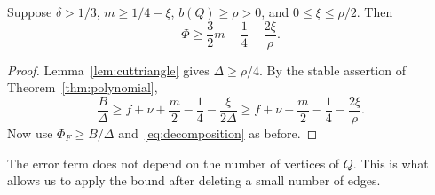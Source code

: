 \begin{theorem}\label{thm:stable}
Suppose $\delta>1/3$, $m\ge1/4-\xi$, $b(Q)\ge\rho>0$, and $0\le\xi\le\rho/2$. Then
\begin{equation}\label{eq:stable}
 \Phi\ge\frac32m-\frac14-\frac{2\xi}{\rho}.
\end{equation}
\end{theorem}
\begin{proof}
Lemma~\ref{lem:cuttriangle} gives $\Delta\ge\rho/4$. By the stable assertion of Theorem~\ref{thm:polynomial},
\[
 \frac B\Delta\ge f+\nu+\frac m2-\frac14-\frac{\xi}{2\Delta}
 \ge f+\nu+\frac m2-\frac14-\frac{2\xi}{\rho}.
\]
Now use $\Phi_F\ge B/\Delta$ and~\eqref{eq:decomposition} as before.
\end{proof}
The error term does not depend on the number of vertices of $Q$. This is what allows us to apply the bound after deleting a small number of edges.
